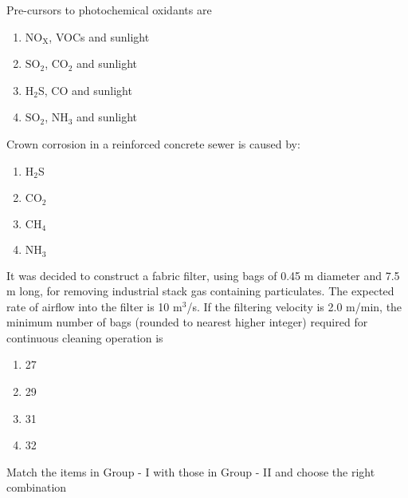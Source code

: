 \iffalse
\chapter{2016}
\author{AI24BTECH11009}
\section{ce}
\fi

\item Pre-cursors to photochemical oxidants are
\begin{enumerate}
    \item $\text{NO}_\text{X}$, VOCs and sunlight
\item $\text{SO}_2$, $\text{CO}_2$ and sunlight
\item $\text{H}_2$S, CO and sunlight
\item $\text{SO}_2$, $\text{NH}_3$ and sunlight \\
\end{enumerate}
\item Crown corrosion in a reinforced concrete sewer is caused by:
\begin{enumerate}
    \item $\text{H}_2$S
    \item $\text{CO}_2$
    \item $\text{CH}_4$
    \item $\text{NH}_3$ \\
\end{enumerate}
\item It was decided to construct a fabric filter, using bags of 0.45 m diameter and 7.5 m long, for removing industrial stack gas containing particulates. The expected rate of airflow into the filter is 10 $\text{m}^3$/s. If the filtering velocity is 2.0 m/min, the minimum number of bags (rounded to nearest higher integer) required for continuous cleaning operation is 
\begin{enumerate}
    \item 27
    \item 29
    \item 31
    \item 32 \\
\end{enumerate}
\item Match the items in Group - I with those in Group - II and choose the right combination
\begin{table}[h!]
  \centering
  
\end{table}

